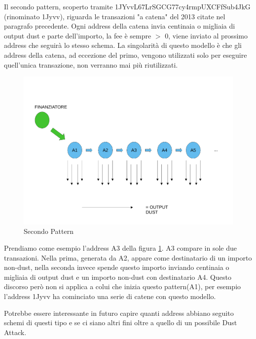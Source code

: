 Il secondo pattern, scoperto tramite 1JYvvL67LrSGCG77cy4rmpUXCFfSub4JkG (rinominato 1Jyvv), riguarda le transazioni "a catena" del 2013 citate nel paragrafo precedente. Ogni address della catena invia centinaia o migliaia di output dust e parte dell'importo, la fee è sempre $>$ 0, viene inviato al prossimo address che seguirà lo stesso schema. La singolarità di questo modello è che gli address della catena, ad eccezione del primo, vengono utilizzati solo per eseguire quell'unica transazione, non verranno mai più riutilizzati.
\begin{figure}[h!]
    \centering
    \includegraphics[scale=0.4]{Images/dust_attack2.pdf}
    \caption{Secondo Pattern}
    \label{fig:schema2}
\end{figure}
\FloatBarrier
Prendiamo come esempio l'address A3 della figura \ref{fig:schema2}. A3 compare in sole due transazioni. Nella prima, generata da A2, appare come destinatario di un importo non-dust, nella seconda invece spende questo importo inviando centinaia o migliaia di output dust e un importo non-dust con destinatario A4. Questo discorso però non si applica a colui che inizia questo pattern(A1), per esempio l'address 1Jyvv ha cominciato una serie di catene con questo modello.

Potrebbe essere interessante in futuro capire quanti address abbiano seguito schemi di questi tipo e se ci siano altri fini oltre a quello di un possibile Dust Attack.
